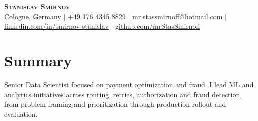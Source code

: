 \documentclass[letterpaper,11pt]{article}
\begin{document}
\begin{center}
    \textbf{\Large \scshape Stanislav Smirnov} \\ \vspace{1pt}
    \small Cologne, Germany $|$ +49 176 4345 8829 $|$ \href{mailto:mr.stassmirnoff@hotmail.com}{\underline{mr.stassmirnoff@hotmail.com}} $|$
    \href{https://www.linkedin.com/in/smirnov-stanislav/}{\underline{linkedin.com/in/smirnov-stanislav}} $|$
    \href{https://github.com/mrStasSmirnoff}{\underline{github.com/mrStasSmirnoff}}
\end{center}

\section{Summary}
Senior Data Scientist focused on payment optimization and fraud. I lead ML and analytics initiatives across routing, retries, authorization and fraud detection, from problem framing and prioritization through production rollout and evaluation.


\end{document}

